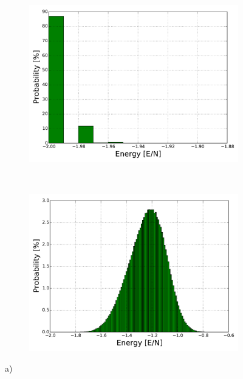 \begin{figure}[H]
    \centering
    \begin{subfigure}{0.5\textwidth}
        \centering
        \includegraphics[width=\linewidth]{result/bilder/hist/MC1000000T1-distN20-hist}
        \caption{}
    \end{subfigure}%
    ~ 
    \begin{subfigure}{0.5\textwidth}
        \centering
        \includegraphics[width=\linewidth]{result/bilder/hist/MC1000000T24-distN20-hist}
        \caption{}
    \end{subfigure}
    \caption{a) }
    \label{fig:tc-chi-cv}
\end{figure}























